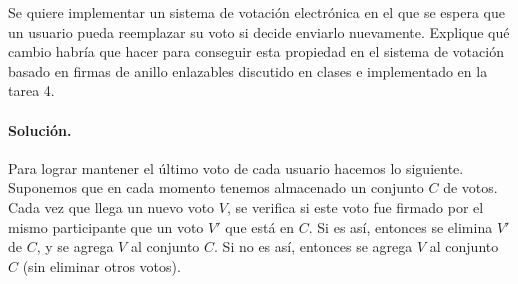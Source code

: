 Se quiere implementar un sistema de votación electrónica en el que se espera que un usuario pueda reemplazar su voto si decide enviarlo nuevamente. Explique qué cambio habría que hacer para conseguir esta propiedad en el sistema de votación basado en firmas de anillo enlazables discutido en clases e implementado en la tarea 4.

\paragraph{Solución.} Para lograr mantener el último voto de cada usuario hacemos lo siguiente. Supo\-nemos que en cada momento tenemos almacenado un conjunto $C$ de votos. Cada vez que llega un nuevo voto $V$, se verifica si este voto fue firmado por el mismo participante que un voto $V'$ que está en $C$. Si es así, entonces se elimina $V'$ de $C$, y se agrega $V$ al conjunto $C$. Si no es así, entonces se agrega $V$ al conjunto $C$ (sin eliminar otros votos).
